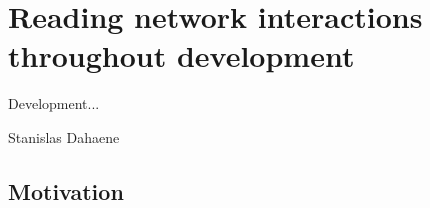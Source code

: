 \chapter{Reading network interactions throughout development}

\epigraph{Development...}{Stanislas Dahaene}

\section{Motivation}


